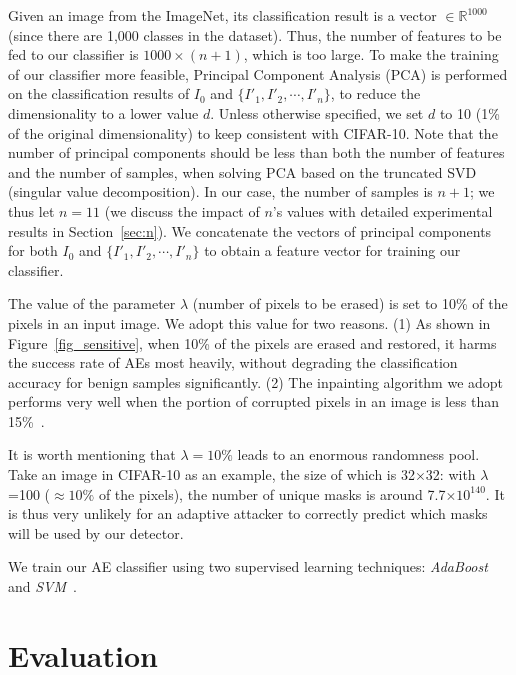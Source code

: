 \documentclass[sigconf]{acmart}
\begin{document}
Given an image from the ImageNet, its classification result is a vector $\in\mathbb{R}^{1000}$ (since there are 1,000 classes in the dataset). 
Thus, the number of features to be fed to our classifier is $1000\times(n+1)$, which is too large.
To make the training of our classifier more feasible,
Principal Component Analysis (PCA) is performed on the classification results 
 of $I_0$ and $\{I'_1, I'_2, \cdots, I'_n\}$, to reduce the dimensionality to a lower value $d$. 
Unless otherwise specified, we set $d$ to 10 (1\% of the original dimensionality) to keep consistent with CIFAR-10. Note that the number of principal components should be less than both the number of features and the number of samples,
when solving PCA based on the truncated SVD (singular value decomposition). In our case, the number of samples is $n+1$;
we thus let $n=11$ (we discuss the impact of $n$'s values with detailed experimental results in Section~\ref{sec:n}). We concatenate the vectors of principal components for
both $I_0$ and $\{I'_1, I'_2, \cdots, I'_n\}$ to obtain a feature vector for training our classifier. 

The value of the parameter $\lambda$ (number of pixels to be erased) is set to 10\% of the pixels in an input image.
We adopt this value for two reasons. (1) As shown in Figure~\ref{fig_sensitive}, when 10\% of
the pixels are erased and restored, it harms the success rate of AEs most heavily, without 
degrading the classification accuracy for benign samples significantly. (2) The 
inpainting algorithm we adopt performs very well when
the portion of corrupted pixels in an image is less than 15\%~\cite{telea2004image}. 

It is worth mentioning that $\lambda=10\%$  leads to an enormous randomness pool. 
Take an image in CIFAR-10 as an example, the size of which is 32$\times$32:
with $\lambda$=100 ($\approx10\%$ of the pixels),
the number of unique masks is around 7.7$\times 10^{140}$. 
It is thus very unlikely for an adaptive attacker to correctly predict which masks will be used
by our detector.

We train our AE classifier using two supervised learning techniques: \emph{AdaBoost}~\cite{freund1997decision} and \emph{SVM}~\cite{cortes1995support}.



\section{Evaluation}\label{sec:eval}
\end{document}
